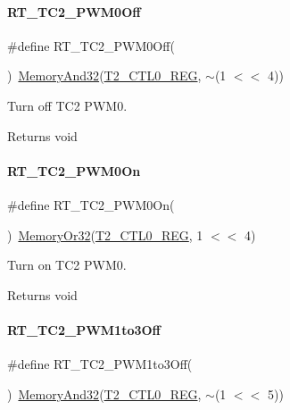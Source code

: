 \paragraph{\texorpdfstring{R\+T\+\_\+\+T\+C2\+\_\+\+P\+W\+M0\+Off}{RT\_TC2\_PWM0Off}}
{\footnotesize\ttfamily \#define R\+T\+\_\+\+T\+C2\+\_\+\+P\+W\+M0\+Off(\begin{DoxyParamCaption}{ }\end{DoxyParamCaption})~\mbox{\hyperlink{a00020_ad87cedffcaadc51db22594fce55173d4}{Memory\+And32}}(\mbox{\hyperlink{a00020_adadaa0ab1ebbd7ba9b70dfd24c3ed44daf2e9deb36631241181cbf09e8d959475}{T2\+\_\+\+C\+T\+L0\+\_\+\+R\+EG}}, $\sim$(1 $<$$<$ 4))}



Turn off T\+C2 P\+W\+M0. 

\begin{DoxyReturn}{Returns}
void 
\end{DoxyReturn}
\mbox{\label{a00047_abaff3048e72dc0cb912c898a0a4c4e14}} 
\paragraph{\texorpdfstring{R\+T\+\_\+\+T\+C2\+\_\+\+P\+W\+M0\+On}{RT\_TC2\_PWM0On}}
{\footnotesize\ttfamily \#define R\+T\+\_\+\+T\+C2\+\_\+\+P\+W\+M0\+On(\begin{DoxyParamCaption}{ }\end{DoxyParamCaption})~\mbox{\hyperlink{a00020_a27874a97deab7cecdde5ddecf466e31e}{Memory\+Or32}}(\mbox{\hyperlink{a00020_adadaa0ab1ebbd7ba9b70dfd24c3ed44daf2e9deb36631241181cbf09e8d959475}{T2\+\_\+\+C\+T\+L0\+\_\+\+R\+EG}}, 1 $<$$<$ 4)}



Turn on T\+C2 P\+W\+M0. 

\begin{DoxyReturn}{Returns}
void 
\end{DoxyReturn}
\mbox{\label{a00047_adec1566e2c2a16ab922163a22f3c99df}} 
\paragraph{\texorpdfstring{R\+T\+\_\+\+T\+C2\+\_\+\+P\+W\+M1to3\+Off}{RT\_TC2\_PWM1to3Off}}
{\footnotesize\ttfamily \#define R\+T\+\_\+\+T\+C2\+\_\+\+P\+W\+M1to3\+Off(\begin{DoxyParamCaption}{ }\end{DoxyParamCaption})~\mbox{\hyperlink{a00020_ad87cedffcaadc51db22594fce55173d4}{Memory\+And32}}(\mbox{\hyperlink{a00020_adadaa0ab1ebbd7ba9b70dfd24c3ed44daf2e9deb36631241181cbf09e8d959475}{T2\+\_\+\+C\+T\+L0\+\_\+\+R\+EG}}, $\sim$(1 $<$$<$ 5))}



